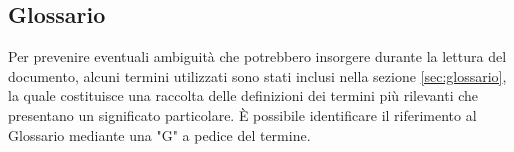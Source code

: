 \subsection{Glossario}
Per prevenire eventuali ambiguità che potrebbero insorgere durante la lettura del documento, alcuni termini utilizzati sono stati inclusi nella sezione \ref{sec:glossario}, la quale costituisce una raccolta delle definizioni dei termini più rilevanti che presentano un significato particolare. È possibile identificare il riferimento al Glossario mediante una "G" a pedice del termine.